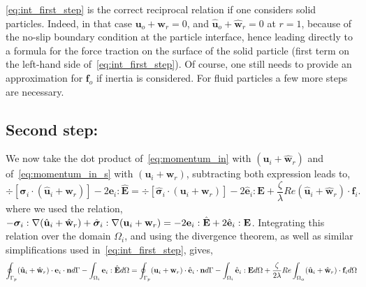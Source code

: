 \ref{eq:int_first_step} is the correct reciprocal relation if one considers solid particles.
Indeed, in that case $\textbf{u}_{o}+\textbf{w}_r = 0$, and $\hat{\textbf{u}}_{o}+\hat{\textbf{w}}_r = 0$ at $r=1$, because of the no-slip boundary condition at the particle interface, hence leading directly to a formula for the force traction on the surface of the solid particle (first term on the left-hand side of~\ref{eq:int_first_step}).
Of course, one still needs to provide an approximation for $\textbf{f}_o$ if inertia is considered. 
For fluid particles a few more steps are necessary. 

\subsection{Second step:}

We now take the dot product of~\ref{eq:momentum_in} with $(\hat{\textbf{u}}_i + \hat{\textbf{w}}_r)$ and of~\ref{eq:momentum_in_s} with $(\textbf{u}_i+ \textbf{w}_r)$, subtracting both expression leads to, 
\begin{equation}
    \div [\bm\sigma_{i}\cdot (\hat{\textbf{u}}_i+\hat{\textbf{w}}_r)]
    - 2\textbf{e}_i : \hat{\textbf{E}}
    =
    \div [\hat{\bm\sigma}_{i}\cdot (\textbf{u}_i+\textbf{w}_r)]
    - 2\hat{\textbf{e}}_i :\textbf{E}
    + \frac{\zeta}{\lambda} Re (\hat{\textbf{u}}_i+\hat{\textbf{w}}_r)\cdot \textbf{f}_{i}. 
    \label{eq:second_step_out}
\end{equation}
where we used the relation, $- \bm\sigma_i :\mathbf{\nabla} (\hat{\textbf{u}}_i+\hat{\textbf{w}}_r)+ \hat{\bm\sigma}_i :\mathbf{\nabla} ({\textbf{u}}_i+{\textbf{w}}_r) =
- 2\textbf{e}_i :\hat{\textbf{E}} + 2\hat{\textbf{e}}_i :\textbf{E}$. 
Integrating this relation over the domain $\Omega_i$, and using the divergence theorem, as well as similar simplifications used in~\ref{eq:int_first_step}, gives, 
\begin{equation}
    \intS[p]{ (\hat{\textbf{u}}_i+\hat{\textbf{w}}_r)\cdot \textbf{e}_{i}\cdot\textbf{n}}
    - \intO[i]{\textbf{e}_i : \hat{\textbf{E}}}
    =
    \intS[p]{ (\textbf{u}_i+\textbf{w}_r)\cdot\hat{\textbf{e}}_{i}\cdot \textbf{n}}
    - \intO[i]{\hat{\textbf{e}}_i :\textbf{E}}
    + \frac{\zeta}{2\lambda} Re \intO{(\hat{\textbf{u}}_i+\hat{\textbf{w}}_r)\cdot \textbf{f}_{i}} 
    \label{eq:second_step_int}
\end{equation}
